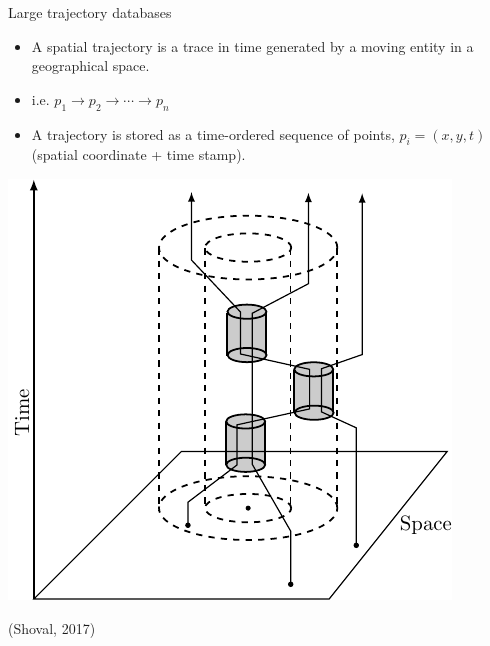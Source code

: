 \begin{frame}{Large trajectory databases}
    \begin{minipage}{0.59\textwidth}
        \begin{itemize}
            \item A spatial trajectory is a trace in time generated by a moving entity in a geographical space.
            \item i.e. $p_1 \rightarrow p_2 \rightarrow \cdots \rightarrow p_n$
            \item A trajectory is stored as a time-ordered sequence of points, $p_i = (x, y, t)$ (spatial coordinate + time stamp).
        \end{itemize}
    \end{minipage}\hfill %
    \begin{minipage}{0.4\textwidth}
        \includegraphics[width=\textwidth]{figures/trajectory}
        \begin{flushright}
            {\tiny (Shoval, 2017)}
        \end{flushright}
    \end{minipage}
\end{frame}

